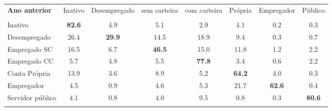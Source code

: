 \begin{table}[htbp]
{\begin{tabular}{lccccccc}
    \textbf{Ano anterior} & \multicolumn{1}{c}{Inativo} & \multicolumn{1}{c}{Desempregado} & \multicolumn{1}{c}{sem carteira} & \multicolumn{1}{c}{com carteira} & \multicolumn{1}{c}{Própria} & \multicolumn{1}{c}{Empregador} & \multicolumn{1}{c}{Público} \\    
 
    \\
    Inativo & \textbf{82.6} & 4.9   & 5.1   & 2.9   & 4.1   & 0.2   & 0.3 \\
    Desempregado & 26.4  & \textbf{29.9} & 14.5  & 18.9  & 9.4   & 0.3   & 0.7 \\
    Empregado SC & 16.5  & 6.7   & \textbf{46.5} & 15.0  & 11.8  & 1.2   & 2.2 \\
    Empregado CC & 5.7   & 4.8   & 5.5   & \textbf{77.8} & 3.4   & 0.6   & 2.2 \\
    Conta Própria & 13.9  & 3.6   & 8.9   & 5.2   & \textbf{64.2} & 4.0   & 0.3 \\
    Empregador & 4.5   & 0.9   & 4.6   & 5.3   & 21.7  & \textbf{62.6} & 0.4 \\
    Servidor público & 4.1   & 0.8   & 4.0   & 9.5   & 0.8   & 0.3   & \textbf{80.6} \\
    	\\
    	\hline \hline     	
    	
    	\end{tabular}%
    }	
  \label{tab:_transicao_ocupacao_anual_matriz}%
\end{table}%

